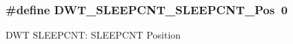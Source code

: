 \subsubsection[{\texorpdfstring{D\+W\+T\+\_\+\+S\+L\+E\+E\+P\+C\+N\+T\+\_\+\+S\+L\+E\+E\+P\+C\+N\+T\+\_\+\+Pos}{DWT_SLEEPCNT_SLEEPCNT_Pos}}]{\setlength{\rightskip}{0pt plus 5cm}\#define D\+W\+T\+\_\+\+S\+L\+E\+E\+P\+C\+N\+T\+\_\+\+S\+L\+E\+E\+P\+C\+N\+T\+\_\+\+Pos~0}\hypertarget{group__CMSIS__DWT_ga0371a84a7996dc5852c56afb2676ba1c}{}\label{group__CMSIS__DWT_ga0371a84a7996dc5852c56afb2676ba1c}
D\+WT S\+L\+E\+E\+P\+C\+NT\+: S\+L\+E\+E\+P\+C\+NT Position 